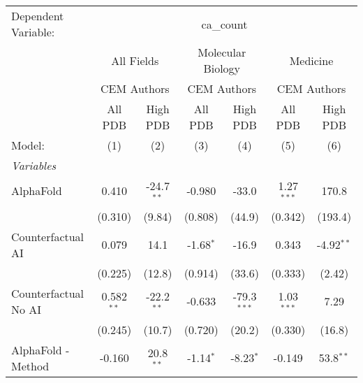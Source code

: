 \begingroup
\centering
\begin{tabular}{lcccccc}
   \tabularnewline \midrule \midrule
   Dependent Variable: & \multicolumn{6}{c}{ca\_count}\\
 & \multicolumn{2}{c}{All Fields} & \multicolumn{2}{c}{Molecular Biology} & \multicolumn{2}{c}{Medicine} \\
\cmidrule(lr){2-3} \cmidrule(lr){4-5} \cmidrule(lr){6-7}
 & \multicolumn{2}{c}{CEM Authors} & \multicolumn{2}{c}{CEM Authors} & \multicolumn{2}{c}{CEM Authors} \\
\cmidrule(lr){2-3} \cmidrule(lr){4-5} \cmidrule(lr){6-7}
 & \multicolumn{1}{c}{All PDB} & \multicolumn{1}{c}{High PDB} & \multicolumn{1}{c}{All PDB} & \multicolumn{1}{c}{High PDB} & \multicolumn{1}{c}{All PDB} & \multicolumn{1}{c}{High PDB} \\
\cmidrule(lr){2-2} \cmidrule(lr){3-3} \cmidrule(lr){4-4} \cmidrule(lr){5-5} \cmidrule(lr){6-6} \cmidrule(lr){7-7}
   Model:                                                     & (1)          & (2)           & (3)           & (4)           & (5)           & (6)\\  
   \midrule
   \emph{Variables}\\
   AlphaFold                                                  & 0.410        & -24.7$^{**}$  & -0.980        & -33.0         & 1.27$^{***}$  & 170.8\\   
                                                              & (0.310)      & (9.84)        & (0.808)       & (44.9)        & (0.342)       & (193.4)\\   
   Counterfactual AI                                          & 0.079        & 14.1          & -1.68$^{*}$   & -16.9         & 0.343         & -4.92$^{**}$\\   
                                                              & (0.225)      & (12.8)        & (0.914)       & (33.6)        & (0.333)       & (2.42)\\   
   Counterfactual No AI                                       & 0.582$^{**}$ & -22.2$^{**}$  & -0.633        & -79.3$^{***}$ & 1.03$^{***}$  & 7.29\\   
                                                              & (0.245)      & (10.7)        & (0.720)       & (20.2)        & (0.330)       & (16.8)\\   
   AlphaFold - Method                                         & -0.160       & 20.8$^{**}$   & -1.14$^{*}$   & -8.23$^{*}$   & -0.149        & 53.8$^{**}$\\   

\end{tabular}
